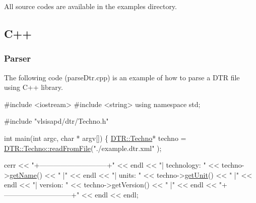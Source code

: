 All source codes are available in the {\ttfamily examples} directory.\hypertarget{dtr_dtrC}{}\subsection{C++}\label{dtr_dtrC}
\hypertarget{dtr_dtrParseC}{}\subsubsection{Parser}\label{dtr_dtrParseC}
The following code ({\ttfamily parse\-Dtr.\-cpp}) is an example of how to parse a D\-T\-R file using C++ library. 
\begin{DoxyCodeInclude}
\textcolor{preprocessor}{#include <iostream>}
\textcolor{preprocessor}{#include <string>}
\textcolor{keyword}{using namespace }std;

\textcolor{preprocessor}{#include "vlsisapd/dtr/Techno.h"}

\textcolor{keywordtype}{int} main(\textcolor{keywordtype}{int} argc, \textcolor{keywordtype}{char} * argv[]) \{
    \hyperlink{class_d_t_r_1_1_techno}{DTR::Techno}* techno = \hyperlink{class_d_t_r_1_1_techno_acf863c2bdb7f1aacc4422c8155c60d17}{DTR::Techno::readFromFile}(\textcolor{stringliteral}{"./example.dtr.xml"}
      );

    cerr << \textcolor{stringliteral}{"+-----------------------------+"} << endl
         << \textcolor{stringliteral}{"| technology:      "} << techno->\hyperlink{class_d_t_r_1_1_techno_aef436e6e20d1dbf2eb78b089ca9d0794}{getName}()    <<   \textcolor{stringliteral}{"    |"}   << endl
         << \textcolor{stringliteral}{"| units:           "} << techno->\hyperlink{class_d_t_r_1_1_techno_a4a8ae82fc3348771d0b53d9a3b11652d}{getUnit}()    << \textcolor{stringliteral}{"      |"} << endl
         << \textcolor{stringliteral}{"| version:         "} << techno->getVersion() << \textcolor{stringliteral}{"      |"} << endl
         << \textcolor{stringliteral}{"+-----------------------------+"} << endl << endl;


\end{DoxyCodeInclude}

